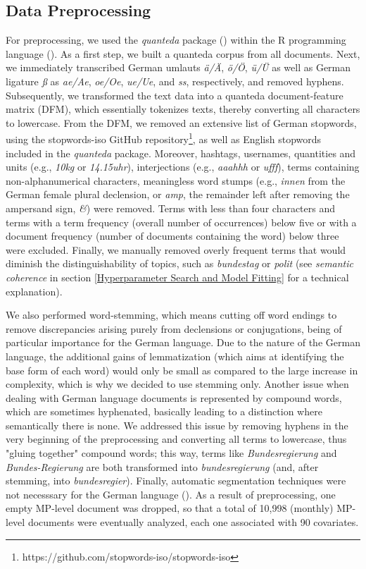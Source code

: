 \subsection{Data Preprocessing}
\label{Data Preprocessing}

For preprocessing, we used the \textit{quanteda} package (\citealp{quanteda}) within the R programming language (\citealp{R}). As a first step, we built a quanteda corpus from all documents. Next, we immediately transcribed German umlauts \textit{ä/Ä}, \textit{ö/Ö}, \textit{ü/Ü} as well as German ligature \textit{ß} as \textit{ae/Ae}, \textit{oe/Oe}, \textit{ue/Ue}, and \textit{ss}, respectively, and removed hyphens. Subsequently, we transformed the text data into a quanteda document-feature matrix (DFM), which essentially tokenizes texts, thereby converting all characters to lowercase. From the DFM, we removed an extensive list of German stopwords, using the stopwords-iso GitHub repository\footnote{https://github.com/stopwords-iso/stopwords-iso}, as well as English stopwords included in the \textit{quanteda} package. Moreover, hashtags, usernames, quantities and units (e.g., \textit{10kg} or \textit{14.15uhr}), interjections (e.g., \textit{aaahhh} or \textit{ufff}), terms containing non-alphanumerical characters, meaningless word stumps (e.g., \textit{innen} from the German female plural declension, or \textit{amp}, the remainder left after removing the ampersand sign, \textit{\&}) were removed. Terms with less than four characters and terms with a term frequency (overall number of occurrences) below five or with a document frequency (number of documents containing the word) below three were excluded. Finally, we manually removed overly frequent terms that would diminish the distinguishability of topics, such as \textit{bundestag} or \textit{polit} (see \textit{semantic coherence} in section \ref{Hyperparameter Search and Model Fitting} for a technical explanation).

We also performed word-stemming, which means cutting off word endings to remove discrepancies arising purely from declensions or conjugations, being of particular importance for the German language. Due to the nature of the German language, the additional gains of lemmatization (which aims at identifying the base form of each word) would only be small as compared to the large increase in complexity, which is why we decided to use stemming only. Another issue when dealing with German language documents is represented by compound words, which are sometimes hyphenated, basically leading to a distinction where semantically there is none. We addressed this issue by removing hyphens in the very beginning of the preprocessing and converting all terms to lowercase, thus "gluing together" compound words; this way, terms like \textit{Bundesregierung} and \textit{Bundes-Regierung} are both transformed into \textit{bundesregierung} (and, after stemming, into \textit{bundesregier}). Finally, automatic segmentation techniques were not necesssary for the German language (\citealp{lucas2015computer}). As a result of preprocessing, one empty MP-level document was dropped, so that a total of 10,998 (monthly) MP-level documents were eventually analyzed, each one associated with 90 covariates.